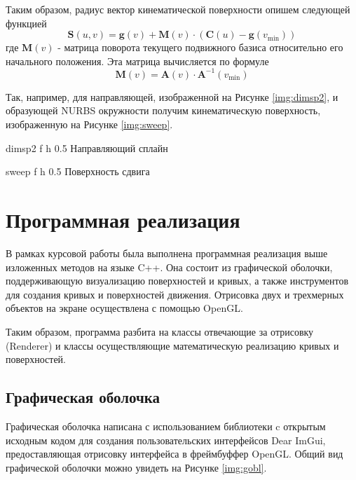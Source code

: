 \documentclass{bmstu}
\begin{document}
Таким образом, радиус вектор кинематической поверхности опишем следующей функцией
\begin{equation}
    \mathbf{S}(u,v) = \mathbf{g}(v) + \mathbf{M}(v)\cdot(\mathbf{C}(u)-\mathbf{g}(v_{\min}))
\end{equation}
где $\mathbf{M}(v)$ - матрица поворота текущего подвижного базиса относительно его начального положения. Эта матрица вычисляется по формуле
\begin{equation}
    \mathbf{M}(v) = \mathbf{A}(v)\cdot\mathbf{A}^{-1}(v_{\min})
\end{equation}

Так, например, для направляющей, изображенной на Рисунке \ref{img:dimsp2}, и образующей NURBS окружности получим кинематическую поверхность, изображенную на Рисунке \ref{img:sweep}.

{dimsp2} %
{f} %
{h} %
{0.5\textwidth} %
{Направляющий сплайн} %

{sweep} %
{f} %
{h} %
{0.5\textwidth} %
{Поверхность сдвига} %

\chapter{Программная реализация}

В рамках курсовой работы была выполнена программная реализация выше изложенных методов на языке C++. Она состоит из графической оболочки, поддерживающую визуализацию поверхностей и кривых, а также инструментов для создания кривых и поверхностей движения. Отрисовка двух и трехмерных объектов на экране осуществлена с помощью OpenGL.

Таким образом, программа разбита на классы отвечающие за отрисовку (Renderer) и классы осуществляющие математическую реализацию кривых и поверхностей.

\section{Графическая оболочка}

Графическая оболочка написана с использованием библиотеки c открытым исходным кодом для создания пользовательских интерфейсов Dear ImGui, предоставляющая отрисовку интерфейса в фреймбуффер OpenGL. Общий вид графической оболочки можно увидеть на Рисунке \ref{img:gobl}.
\end{document}
